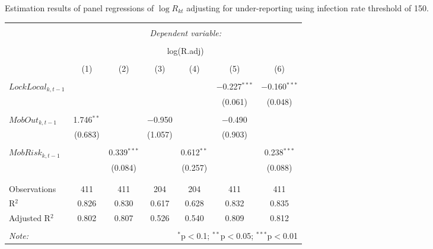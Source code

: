   \caption{Estimation results of panel regressions of $\log R_{kt}$ adjusting for under-reporting using infection rate threshold of 150.} 
  \label{} 
\small 
\begin{tabular}{@{\extracolsep{5pt}}lcccccc} 
\\[-1.8ex]\hline 
\hline \\[-1.8ex] 
 & \multicolumn{6}{c}{\textit{Dependent variable:}} \\ 
\cline{2-7} 
\\[-1.8ex] & \multicolumn{6}{c}{log(R.adj)} \\ 
\\[-1.8ex] & (1) & (2) & (3) & (4) & (5) & (6)\\ 
\hline \\[-1.8ex] 
 $LockLocal_{k,t-1}$ &  &  &  &  & $-$0.227$^{***}$ & $-$0.160$^{***}$ \\ 
  &  &  &  &  & (0.061) & (0.048) \\ 
  & & & & & & \\ 
 $MobOut_{k,t-1}$ & 1.746$^{**}$ &  & $-$0.950 &  & $-$0.490 &  \\ 
  & (0.683) &  & (1.057) &  & (0.903) &  \\ 
  & & & & & & \\ 
 $MobRisk_{k,t-1}$ &  & 0.339$^{***}$ &  & 0.612$^{**}$ &  & 0.238$^{***}$ \\ 
  &  & (0.084) &  & (0.257) &  & (0.088) \\ 
  & & & & & & \\ 
\hline \\[-1.8ex] 
Observations & 411 & 411 & 204 & 204 & 411 & 411 \\ 
R$^{2}$ & 0.826 & 0.830 & 0.617 & 0.628 & 0.832 & 0.835 \\ 
Adjusted R$^{2}$ & 0.802 & 0.807 & 0.526 & 0.540 & 0.809 & 0.812 \\ 
\hline 
\hline \\[-1.8ex] 
\textit{Note:}  & \multicolumn{6}{r}{$^{*}$p$<$0.1; $^{**}$p$<$0.05; $^{***}$p$<$0.01} \\ 
\end{tabular} 